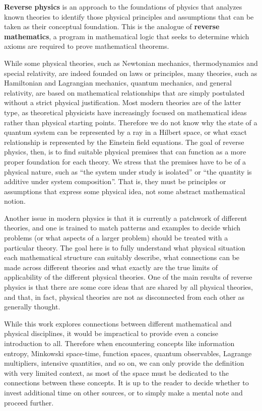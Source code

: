 \textbf{Reverse physics} is an approach to the foundations of physics that analyzes known theories to identify those physical principles and assumptions that can be taken as their conceptual foundation. This is the analogue of \textbf{reverse mathematics}, a program in mathematical logic that seeks to determine which axioms are required to prove mathematical theorems.

While some physical theories, such as Newtonian mechanics, thermodynamics and special relativity, are indeed founded on laws or principles, many theories, such as Hamiltonian and Lagrangian mechanics, quantum mechanics, and general relativity, are based on mathematical relationships that are simply postulated without a strict physical justification. Most modern theories are of the latter type, as theoretical physicists have increasingly focused on mathematical ideas rather than physical starting points. Therefore we do not know why the state of a quantum system can be represented by a ray in a Hilbert space, or what exact relationship is represented by the Einstein field equations. The goal of reverse physics, then, is to find suitable physical premises that can function as a more proper foundation for each theory. We stress that the premises have to be of a physical nature, such as ``the system under study is isolated'' or ``the quantity is additive under system composition''. That is, they must be principles or assumptions that express some physical idea, not some abstract mathematical notion.

Another issue in modern physics is that it is currently a patchwork of different theories, and one is trained to match patterns and examples to decide which problems (or what aspects of a larger problem) should be treated with a particular theory. The goal here is to fully understand what physical situation each mathematical structure can suitably describe, what connections can be made across different theories and what exactly are the true limits of applicability of the different physical theories. One of the main results of reverse physics is that there are some core ideas that are shared by all physical theories, and that, in fact, physical theories are not as disconnected from each other as generally thought.

While this work explores connections between different mathematical and physical disciplines, it would be impractical to provide even a concise introduction to all. Therefore when encountering concepts like information entropy, Minkowski space-time, function spaces, quantum observables, Lagrange multipliers, intensive quantities, and so on, we can only provide the definition with very limited context, as most of the space must be dedicated to the connections between these concepts. It is up to the reader to decide whether to invest additional time on other sources, or to simply make a mental note and proceed further.

